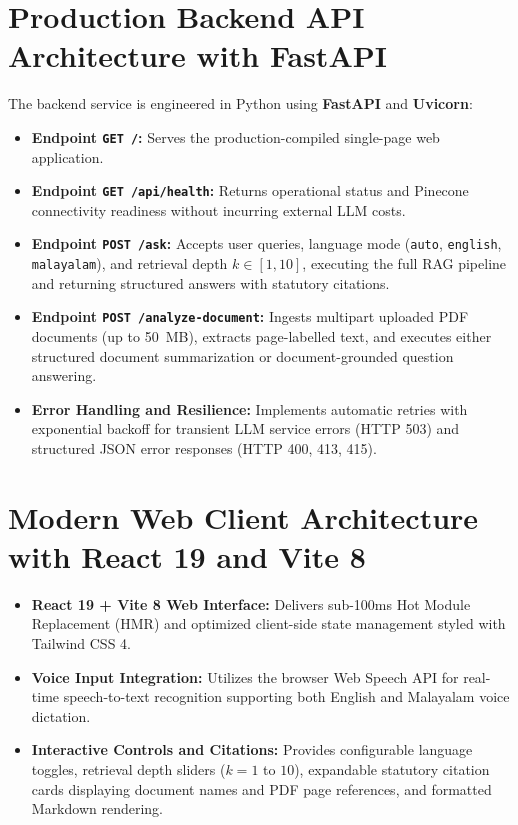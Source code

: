 \documentclass[12pt,a4paper]{report}
\begin{document}
\section{Production Backend API Architecture with FastAPI}
The backend service is engineered in Python using \textbf{FastAPI} and \textbf{Uvicorn}:
\begin{itemize}
    \item \textbf{Endpoint \texttt{GET /}:} Serves the production-compiled single-page web application.
    \item \textbf{Endpoint \texttt{GET /api/health}:} Returns operational status and Pinecone connectivity readiness without incurring external LLM costs.
    \item \textbf{Endpoint \texttt{POST /ask}:} Accepts user queries, language mode (\texttt{auto}, \texttt{english}, \texttt{malayalam}), and retrieval depth $k \in [1, 10]$, executing the full RAG pipeline and returning structured answers with statutory citations.
    \item \textbf{Endpoint \texttt{POST /analyze-document}:} Ingests multipart uploaded PDF documents (up to 50~MB), extracts page-labelled text, and executes either structured document summarization or document-grounded question answering.
    \item \textbf{Error Handling and Resilience:} Implements automatic retries with exponential backoff for transient LLM service errors (HTTP 503) and structured JSON error responses (HTTP 400, 413, 415).
\end{itemize}

\section{Modern Web Client Architecture with React 19 and Vite 8}
\begin{itemize}
    \item \textbf{React 19 + Vite 8 Web Interface:} Delivers sub-100ms Hot Module Replacement (HMR) and optimized client-side state management styled with Tailwind CSS 4.
    \item \textbf{Voice Input Integration:} Utilizes the browser Web Speech API for real-time speech-to-text recognition supporting both English and Malayalam voice dictation.
    \item \textbf{Interactive Controls and Citations:} Provides configurable language toggles, retrieval depth sliders ($k=1$ to $10$), expandable statutory citation cards displaying document names and PDF page references, and formatted Markdown rendering.
\end{itemize}
\end{document}

